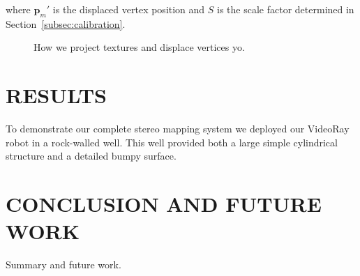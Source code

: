 \documentclass[a4paper,twoside]{article}
\begin{document}
where $\mathbf{p}_{m}'$ is the displaced vertex position and $S$ is the scale factor determined in Section~\ref{subsec:calibration}. 
\begin{figure*}[!ht]
   \vspace{-0.2cm}
   \caption{How we project textures and displace vertices yo.}
  \label{fig:projtex}
 \end{figure*}

\section{\uppercase{Results}}
\label{sec:results}

To demonstrate our complete stereo mapping system we deployed our VideoRay robot in a rock-walled well.
This well provided both a large simple cylindrical structure and a detailed bumpy surface.  

\section{\uppercase{Conclusion and Future Work}}
\label{sec:conclusion}

\noindent Summary and future work.


{\small
}
\end{document}
